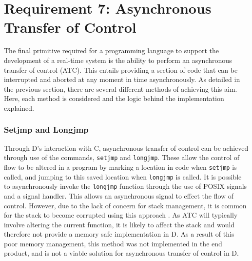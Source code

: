 \section{Requirement 7: Asynchronous Transfer of Control} %
The final primitive required for a programming language to support the development 
of a real-time system is the ability to perform an asynchronous transfer of 
control (ATC). This entails providing a section of code that can be interrupted 
and aborted at any moment in time asynchronously.
As detailed in the previous section, there are several different methods of 
achieving this aim. Here, each method is considered and the logic behind the 
implementation explained. 

\subsubsection*{Setjmp and Longjmp} 
Through D's interaction with C, asynchronous transfer of control can be achieved 
through use of the commands, \texttt{setjmp} and \texttt{longjmp}. These allow 
the control of flow to be altered in a program by marking a location in code when 
\texttt{setjmp} is called, and jumping to this saved location when \texttt{longjmp} 
is called. It is possible to asynchronously invoke the \texttt{longjmp} function
through the use of POSIX signals and a signal handler. This allows an asynchronous 
signal to effect the flow of control. However, due to the lack of concern for 
stack management, it is common for the stack to become corrupted using this approach
\cite{unwinding-stack}. As ATC will typically involve altering the current function, 
it is likely to affect the stack and would therefore not provide a memory safe 
implementation in D. As a result of this poor memory management, this method was 
not implemented in the end product, and is not a viable solution for asynchronous 
transfer of control in D. 

